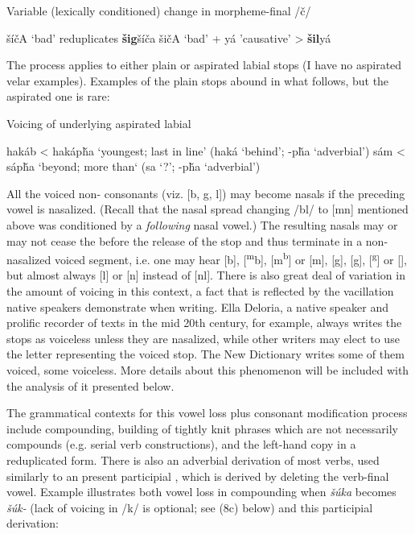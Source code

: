 \documentclass[output=paper]{LSP/langsci}
\begin{document}
\begin{exe}\label{ex:rood:5}
\ex Variable (lexically conditioned) change in morpheme-final /\v{c}/
\begin{xlist}
\ex \v{s}\'i\v{c}A `bad' reduplicates \textbf{\v{s}ig}\v{s}\'i\v{c}a
\ex \v{s}i\v{c}A `bad' + y\'a 'causative' > \textbf{\v{s}il}y\'a
\end{xlist}
\end{exe}

The process applies to either plain or aspirated labial stops (I have no aspirated velar examples). Examples of the plain stops abound in what follows, but the aspirated one is rare:

\begin{exe}\label{ex:rood:6}
\ex Voicing of underlying aspirated labial
\begin{xlist}
\ex hak\'ab < hak\'ap\v{h}a `youngest; last in line' (hak\'a `behind'; -p\v{h}a `adverbial')
\ex s\'am < s\'ap\v{h}a `beyond; more than` (sa `?'; -p\v{h}a `adverbial')
\end{xlist}
\end{exe}

All the voiced non- consonants (viz. [b, g, l]) may become nasals if the preceding vowel is nasalized. (Recall that the nasal spread changing /bl/ to [mn] mentioned above was conditioned by a \textit{following} nasal vowel.) The resulting nasals may or may not cease the  before the release of the stop and thus terminate in a non-nasalized voiced segment, i.e. one may hear [b], [\textsuperscript{m}b], [m\textsuperscript{b}] or [m], [g], [\textsuperscript{}g], [\textsuperscript{g}] or [], but almost always [l] or [n] instead of [nl]. There is also great deal of variation in the amount of voicing in this context, a fact that is reflected by the vacillation native speakers demonstrate when writing. Ella Deloria, a native speaker and prolific recorder of  texts in the mid 20th century, for example, always writes the stops as voiceless unless they are nasalized, while other writers may elect to use the letter representing the voiced stop. The New  Dictionary writes some of them voiced, some voiceless. More details about this phenomenon will be included with the analysis of it presented below.

The grammatical contexts for this vowel loss plus consonant modification process include compounding, building of tightly knit phrases which are not necessarily compounds (e.g. serial verb constructions), and the left-hand copy in a reduplicated form. There is also an adverbial derivation of most verbs, used similarly to an  present participial , which is derived by deleting the verb-final vowel. Example  illustrates both vowel loss in compounding when \textit{\v{s}\'uka} becomes \textit{\v{s}\'uk-} (lack of voicing in /k/ is optional; see (8c) below) and this participial derivation:
\end{document}
